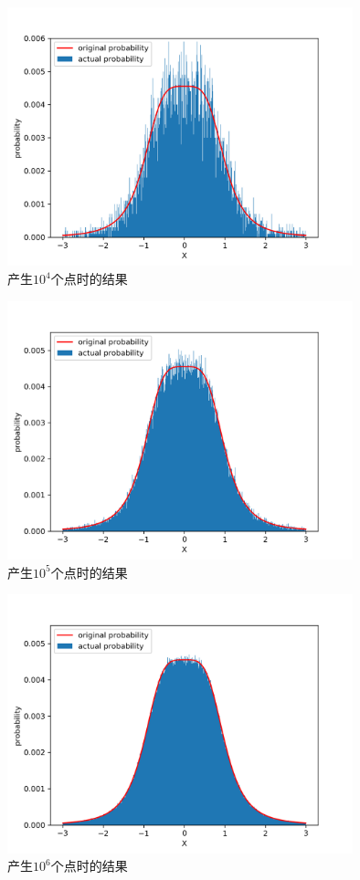 \documentclass[a4paper,11pt]{article}
\begin{document}
\begin{figure}[!htbp]        
\centering
\includegraphics[width=10cm]{104.png}      
\caption{ 产生$10^{4}$个点时的结果}      
\end{figure}

\begin{figure}[!htbp]        
\centering
\includegraphics[width=10cm]{105.png}      
\caption{ 产生$10^{5}$个点时的结果}      
\end{figure}

\begin{figure}[!htbp]        
\centering
\includegraphics[width=10cm]{106.png}      
\caption{ 产生$10^{6}$个点时的结果}      
\end{figure}
\end{document}
